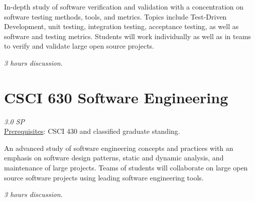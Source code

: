 \documentclass[12pt]{article}
\begin{document}
   In-depth study of software verification and validation with a concentration on software testing methods, tools, and metrics. Topics include Test-Driven Development, unit testing, integration testing, acceptance testing, as well as software and testing metrics. Students will work individually as well as in teams to verify and validate large open source projects.

  \textit{3 hours discussion.}

  \section*{CSCI 630 Software Engineering}
  \textit{3.0 SP} \\
  \underline{Prerequisites}: CSCI 430 and classified graduate standing.

   An advanced study of software engineering concepts and practices with an emphasis on software design patterns, static and dynamic analysis, and maintenance of large projects. Teams of students will collaborate on large open source software projects using leading software engineering tools. 

   \textit{3 hours discussion.}
  
\end{document}
